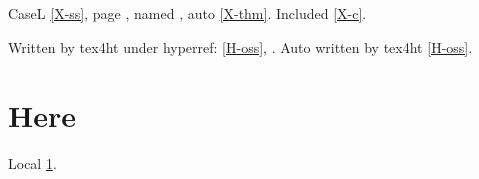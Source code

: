 \documentclass{article}
\begin{document}
CaseL \ref{X-ss}, page \pageref{X-front}, named , auto \autoref{X-thm}.
Included \ref{X-c}.

Written by tex4ht under hyperref: \ref{H-oss}, .
Auto written by tex4ht \autoref{H-oss}.

\section{Here}\label{here}
Local \ref{here}.
\end{document}
